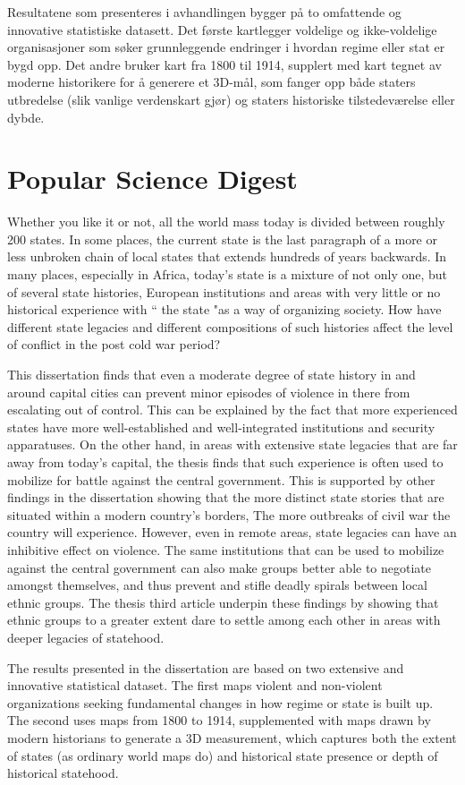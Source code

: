\documentclass[12pt]{article}
\begin{document}
Resultatene som presenteres i avhandlingen bygger på to omfattende og innovative
statistiske datasett. Det første kartlegger voldelige og ikke-voldelige
organisasjoner som søker grunnleggende endringer i hvordan regime eller stat er
bygd opp. Det andre bruker kart fra 1800 til 1914, supplert med kart tegnet av
moderne historikere for å generere et 3D-mål, som fanger opp både staters
utbredelse (slik vanlige verdenskart gjør) og staters historiske
tilstedeværelse eller dybde.

\section{Popular Science Digest}

Whether you like it or not, all the world mass today is divided between roughly
200 states. In some places, the current state is the last paragraph of a more or
less unbroken chain of local states that extends hundreds of
years backwards. In many places, especially in Africa, today's state is a
mixture of not only one, but of several state histories, European institutions and
areas with very little or no historical experience with `` the state "as a way
of organizing society. How have different state legacies and different compositions
of such histories affect the level of conflict in the post cold war period?

This dissertation finds that even a moderate degree of state history in and
around capital cities can prevent minor episodes of violence in there from
escalating out of control. This can be explained by the fact that more
experienced states have more well-established and well-integrated institutions
and security apparatuses. On the other hand, in areas with extensive state
legacies that are far away from today's capital, the thesis finds that such
experience is often used to mobilize for battle against the central government.
This is supported by other findings in the dissertation showing that the more
distinct state stories that are situated within a modern country's borders, The
more outbreaks of civil war the country will experience. However, even in remote
areas, state legacies can have an inhibitive effect on violence. The same
institutions that can be used to mobilize against the central government can
also make groups better able to negotiate amongst themselves, and thus prevent
and stifle deadly spirals between local ethnic groups. The thesis third article
underpin these findings by showing that ethnic groups to a greater extent dare
to settle among each other in areas with deeper legacies of statehood.

The results presented in the dissertation are based on two extensive and innovative
statistical dataset. The first maps violent and non-violent organizations
seeking fundamental changes in how regime or state is built up. The second uses
maps from 1800 to 1914, supplemented with maps drawn by modern historians to
generate a 3D measurement, which captures both the extent of states (as
ordinary world maps do) and historical state presence or depth of historical
statehood.

\clearpage



\end{document}
